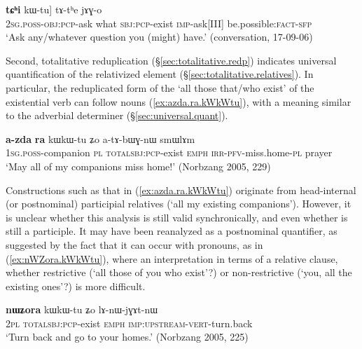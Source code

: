 \begin{exe}
\ex \label{ex:nAkAthu.tChi.kWtu}
\gll [[\textbf{nɤ-kɤ-tʰu}] \textbf{tɕʰi} kɯ-tu] tɤ-tʰe jɤɣ-o \\
\textsc{2sg}.\textsc{poss}-\textsc{obj}:\textsc{pcp}-ask what \textsc{sbj}:\textsc{pcp}-exist \textsc{imp}-ask[III] be.possible:\textsc{fact}-\textsc{sfp} \\
\glt `Ask any/whatever question you (might) have.' (conversation, 17-09-06)
\end{exe}

 
Second, totalitative reduplication (§\ref{sec:totalitative.redp}) indicates universal quantification of the relativized element (§\ref{sec:totalitative.relatives}). In particular, the reduplicated form of the  `all those that/who exist' of the existential verb  can follow nouns (\ref{ex:azda.ra.kWkWtu}), with a meaning similar to the adverbial determiner  (§\ref{sec:universal.quant}). 

\begin{exe}
\ex \label{ex:azda.ra.kWkWtu}
\gll \textbf{a-zda} \textbf{ra} kɯ\redp{}kɯ-tu ʑo a-tɤ-bɯɣ-nɯ smɯlɤm \\
\textsc{1sg}.\textsc{poss}-companion \textsc{pl} \textsc{total}\redp{}\textsc{sbj}:\textsc{pcp}-exist \textsc{emph} \textsc{irr}-\textsc{pfv}-miss.home-\textsc{pl} prayer \\
\glt `May all of my companions miss home!' (Norbzang 2005, 229)
\end{exe}

Constructions such as that in (\ref{ex:azda.ra.kWkWtu}) originate from head-internal (or postnominal) participial relatives (`all my existing companions'). However, it is unclear whether this analysis is still valid synchronically, and even whether  is still a participle. It may have been reanalyzed as a postnominal quantifier, as suggested by the fact that it can occur with pronouns, as in (\ref{ex:nWZora.kWkWtu}), where an interpretation in terms of a relative clause, whether restrictive (`all those of you who exist'?) or non-restrictive (`you, all the existing ones'?) is more difficult.
 
\begin{exe}
\ex \label{ex:nWZora.kWkWtu}
\gll  \textbf{nɯʑora} kɯ\redp{}kɯ-tu ʑo lɤ-nɯ-jɣɤt-nɯ \\
\textsc{2pl} \textsc{total}\redp{}\textsc{sbj}:\textsc{pcp}-exist \textsc{emph} \textsc{imp}:\textsc{upstream}-\textsc{vert}-turn.back \\
\glt `Turn back and go to your homes.' (Norbzang 2005, 225)
\end{exe}


